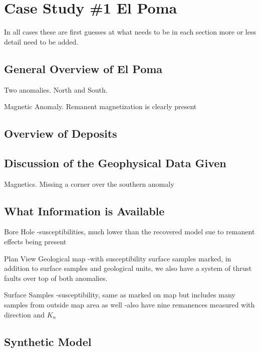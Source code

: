 
\chapter{Case Study \#1 El Poma}
\label{ch:CaseStudy1}

In all cases these are first guesses at what needs to be in each section more or less detail need to be added.

\section{General Overview of El Poma}
\label{sec:General Over View of El Poma}

Two anomalies. North and South. 

Magnetic Anomaly. Remanent magnetization is clearly present

\section{Overview of Deposits}
\label{sec:Overview of Deposits:ElPoma}

\section{Discussion of the Geophysical Data Given}
\label{sec:Discussion of the Geophysical Data Given:ElPoma}

Magnetics. Missing a corner over the southern anomaly

\section{What Information is Available}
\label{sec:What Information is Available:ElPoma}

Bore Hole
-susceptibilities, much lower than the recovered model sue to remanent effects being present

Plan View Geological map
-with susceptibility surface samples marked, in addition to surface samples and geological units, we also have a system of thrust faults over top of both anomalies.

Surface Samples
-susceptibility, same as marked on map but includes many samples from outside map area as well
-also have nine remanences measured with direction and $K_n$

\section{Synthetic Model}
\label{sec:Synthetic Mode:ElPomal}

